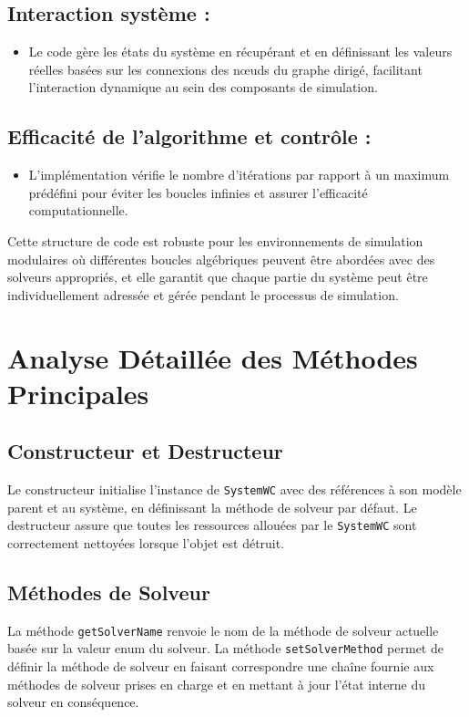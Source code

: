 \subsection*{Interaction système :}
\begin{itemize}
    \item Le code gère les états du système en récupérant et en définissant les valeurs réelles basées sur les connexions des nœuds du graphe dirigé, facilitant l'interaction dynamique au sein des composants de simulation.
\end{itemize}

\subsection*{Efficacité de l'algorithme et contrôle :}
\begin{itemize}
    \item L'implémentation vérifie le nombre d'itérations par rapport à un maximum prédéfini pour éviter les boucles infinies et assurer l'efficacité computationnelle.
\end{itemize}

Cette structure de code est robuste pour les environnements de simulation modulaires où différentes boucles algébriques peuvent être abordées avec des solveurs appropriés, et elle garantit que chaque partie du système peut être individuellement adressée et gérée pendant le processus de simulation.

\section{Analyse Détaillée des Méthodes Principales}

\subsection*{Constructeur et Destructeur}
Le constructeur initialise l'instance de \texttt{SystemWC} avec des références à son modèle parent et au système, en définissant la méthode de solveur par défaut. Le destructeur assure que toutes les ressources allouées par le \texttt{SystemWC} sont correctement nettoyées lorsque l'objet est détruit.

\subsection*{Méthodes de Solveur}
La méthode \texttt{getSolverName} renvoie le nom de la méthode de solveur actuelle basée sur la valeur enum du solveur. La méthode \texttt{setSolverMethod} permet de définir la méthode de solveur en faisant correspondre une chaîne fournie aux méthodes de solveur prises en charge et en mettant à jour l'état interne du solveur en conséquence.

